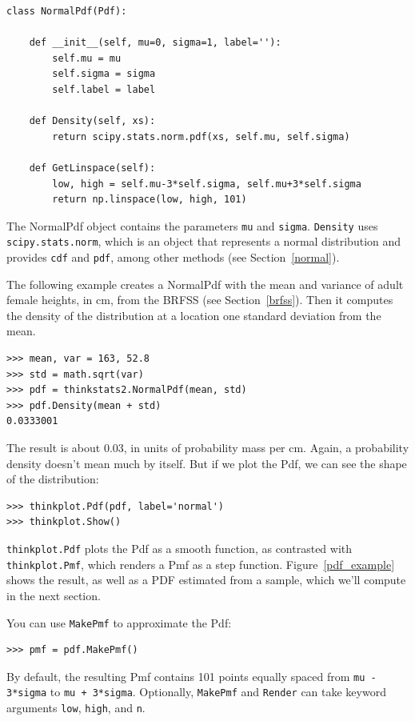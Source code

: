 \documentclass[12pt]{book}
\begin{document}
\begin{verbatim}
class NormalPdf(Pdf):

    def __init__(self, mu=0, sigma=1, label=''):
        self.mu = mu
        self.sigma = sigma
        self.label = label

    def Density(self, xs):
        return scipy.stats.norm.pdf(xs, self.mu, self.sigma)

    def GetLinspace(self):
        low, high = self.mu-3*self.sigma, self.mu+3*self.sigma
        return np.linspace(low, high, 101)
\end{verbatim}

The NormalPdf object contains the parameters {\tt mu} and
{\tt sigma}.  {\tt Density} uses
{\tt scipy.stats.norm}, which is an object that represents a normal
distribution and provides {\tt cdf} and {\tt pdf}, among other
methods (see Section~\ref{normal}).

The following example creates a NormalPdf with the mean and variance
of adult female heights, in cm, from the BRFSS (see
Section~\ref{brfss}).  Then it computes the density of the
distribution at a location one standard deviation from the mean.

\begin{verbatim}
>>> mean, var = 163, 52.8
>>> std = math.sqrt(var)
>>> pdf = thinkstats2.NormalPdf(mean, std)
>>> pdf.Density(mean + std)
0.0333001
\end{verbatim}

The result is about 0.03, in units of probability mass per cm.
Again, a probability density doesn't mean much by itself.  But if
we plot the Pdf, we can see the shape of the distribution:

\begin{verbatim}
>>> thinkplot.Pdf(pdf, label='normal')
>>> thinkplot.Show()
\end{verbatim}

{\tt thinkplot.Pdf} plots the Pdf as a smooth function,
as contrasted with {\tt thinkplot.Pmf}, which renders a Pmf as a
step function.  Figure~\ref{pdf_example} shows the result, as well
as a PDF estimated from a sample, which we'll compute in the next
section.

You can use {\tt MakePmf} to approximate the Pdf:

\begin{verbatim}
>>> pmf = pdf.MakePmf()
\end{verbatim}

By default, the resulting Pmf contains 101 points equally spaced from
{\tt mu - 3*sigma} to {\tt mu + 3*sigma}.  Optionally, {\tt MakePmf}
and {\tt Render} can take keyword arguments {\tt low}, {\tt high},
and {\tt n}.
\end{document}
